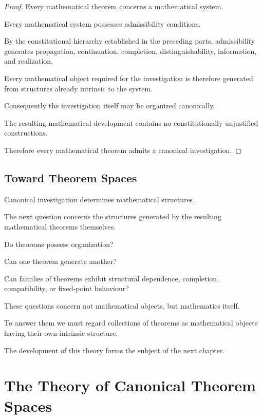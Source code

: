 \documentclass[13pt,openany]{book}
\theoremstyle{plain}
\theoremstyle{definition}
\begin{document}
\begin{proof}
Every mathematical theorem concerns a mathematical system.

Every mathematical system possesses admissibility conditions.

By the constitutional hierarchy established in the preceding parts,
admissibility generates propagation, continuation, completion,
distinguishability, information, and realization.

Every mathematical object required for the investigation is therefore generated
from structures already intrinsic to the system.

Consequently the investigation itself may be organized canonically.

The resulting mathematical development contains no constitutionally
unjustified constructions.

Therefore every mathematical theorem admits a canonical investigation.
\end{proof}

\section{Toward Theorem Spaces}

Canonical investigation determines mathematical structures.

The next question concerns the structures generated by the resulting
mathematical theorems themselves.

Do theorems possess organization?

Can one theorem generate another?

Can families of theorems exhibit structural dependence, completion,
compatibility, or fixed-point behaviour?

These questions concern not mathematical objects, but mathematics itself.

To answer them we must regard collections of theorems as mathematical objects
having their own intrinsic structure.

The development of this theory forms the subject of the next chapter.

\chapter{The Theory of Canonical Theorem Spaces}
\end{document}
